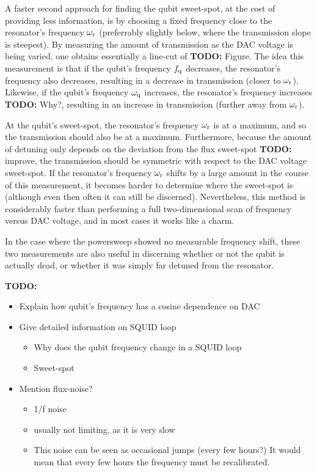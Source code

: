         A faster second approach for finding the qubit sweet-spot, at the cost of providing less information, is by choosing a fixed frequency close to the resonator's frequency $\omega_\text{r}$ (preferrably slightly below, where the transmission slope is steepest). By measuring the amount of transmission as the DAC voltage is being varied, one obtains essentially a line-cut of \textbf{TODO:} Figure. The idea this measurement is that if the qubit's frequency $f_\text{q}$ decreases, the resonator's frequency also decreases, resulting in a decrease in transmission (closer to $\omega_\text{r}$). Likewise, if the qubit's frequency $\omega_\text{q}$ increases, the resonator's frequency increases \textbf{TODO:} Why?, resulting in an increase in transmission (further away from $\omega_\text{r}$).

        At the qubit's sweet-spot, the resonator's frequency $\omega_\text{r}$ is at a maximum, and so the transmission should also be at a maximum. Furthermore, because the amount of detuning only depends on the deviation from the flux sweet-spot \textbf{TODO:} improve, the transmission should be symmetric with respect to the DAC voltage sweet-spot. If the resonator's frequency $\omega_\text{r}$ shifts by a large amount in the course of this measurement, it becomes harder to determine where the sweet-spot is (although even then often it can still be discerned). Nevertheless, this method is considerably faster than performing a full two-dimensional scan of frequency versus DAC voltage, and in most cases it works like a charm.

        In the case where the powersweep showed no measurable frequency shift, these two measurements are also useful in discerning whether or not the qubit is actually dead, or whether it was simply far detuned from the resonator.


        \textbf{TODO:}
        \begin{itemize}
          \item Explain how qubit's frequency has a cosine dependence on DAC
          \item Give detailed information on SQUID loop
          \begin{itemize}
            \item Why does the qubit frequency change in a SQUID loop
            \item Sweet-spot
          \end{itemize}
          \item Mention flux-noise?
          \begin{itemize}
            \item 1/f noise
            \item usually not limiting, as it is very slow
            \item This noise can be seen as occasional jumps (every few hours?) It would mean that every few hours the frequency must be recalibrated.
          \end{itemize}
        \end{itemize}

